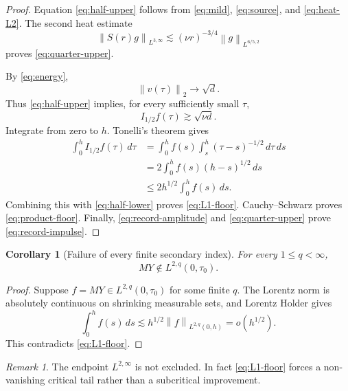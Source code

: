 \documentclass[11pt]{article}
\newtheorem{corollary}[theorem]{Corollary}
\theoremstyle{remark}
\newtheorem{remark}[theorem]{Remark}
\newcommand{\norm}[1]{\left\|#1\right\|}
\begin{document}
\begin{proof}
Equation \eqref{eq:half-upper} follows from
\eqref{eq:mild}, \eqref{eq:source}, and
\eqref{eq:heat-L2}.  The second heat estimate
\begin{equation}
\label{eq:heat-L3}
 \norm{S(r)g}_{L^{3,\infty}}
 \lesssim
 (\nu r)^{-3/4}\norm{g}_{L^{6/5,2}}
\end{equation}
proves \eqref{eq:quarter-upper}.

By \eqref{eq:energy},
\[
 \norm{v(\tau)}_2\longrightarrow\sqrt d.
\]
Thus \eqref{eq:half-upper} implies, for every sufficiently small
\(\tau\),
\begin{equation}
\label{eq:half-lower}
 I_{1/2}f(\tau)\gtrsim\sqrt{\nu d}.
\end{equation}
Integrate from zero to \(h\).  Tonelli's theorem gives
\[
\begin{aligned}
 \int_0^h I_{1/2}f(\tau)\,d\tau
 &=
 \int_0^h f(s)
 \int_s^h(\tau-s)^{-1/2}\,d\tau\,ds\\
 &=
 2\int_0^h f(s)(h-s)^{1/2}\,ds\\
 &\leq
 2h^{1/2}\int_0^h f(s)\,ds.
\end{aligned}
\]
Combining this with \eqref{eq:half-lower} proves
\eqref{eq:L1-floor}.  Cauchy--Schwarz proves
\eqref{eq:product-floor}.  Finally,
\eqref{eq:record-amplitude} and \eqref{eq:quarter-upper} prove
\eqref{eq:record-impulse}.
\end{proof}

\begin{corollary}[Failure of every finite secondary index]
\label{cor:lorentz}
For every \(1\leq q<\infty\),
\begin{equation}
\label{eq:no-lorentz}
 MY\notin L^{2,q}(0,\tau_0).
\end{equation}
\end{corollary}

\begin{proof}
Suppose \(f=MY\in L^{2,q}(0,\tau_0)\) for some finite \(q\).
The Lorentz norm is absolutely continuous on shrinking measurable sets,
and Lorentz Holder gives
\[
 \int_0^hf(s)\,ds
 \lesssim
 h^{1/2}\norm{f}_{L^{2,q}(0,h)}
 =
 o(h^{1/2}).
\]
This contradicts \eqref{eq:L1-floor}.
\end{proof}

\begin{remark}
The endpoint \(L^{2,\infty}\) is not excluded.  In fact
\eqref{eq:L1-floor} forces a non-vanishing critical tail rather than a
subcritical improvement.
\end{remark}
\end{document}
